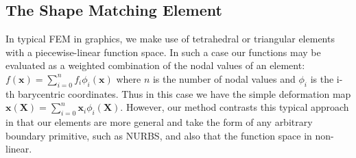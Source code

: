 \subsection{The Shape Matching Element}
In typical FEM in graphics, we make use of tetrahedral or triangular elements with a piecewise-linear function space. In such a case our functions may be evaluated as a weighted combination of the nodal values of an element: $f(\mathbf x)=\sum_{i=0}^n f_i \phi_i(\mathbf{x})$ where $n$ is the number of nodal values and $\phi_i$ is the i-th barycentric coordinates. Thus in this case we have the simple deformation map $\mathbf{x(X)} = \sum_{i=0}^n \mathbf{x}_i \phi_i(\mathbf{X})$. However, our method contrasts this typical approach in that our elements are more general and take the form of any arbitrary boundary primitive, such as NURBS, and also that the function space in non-linear. 

